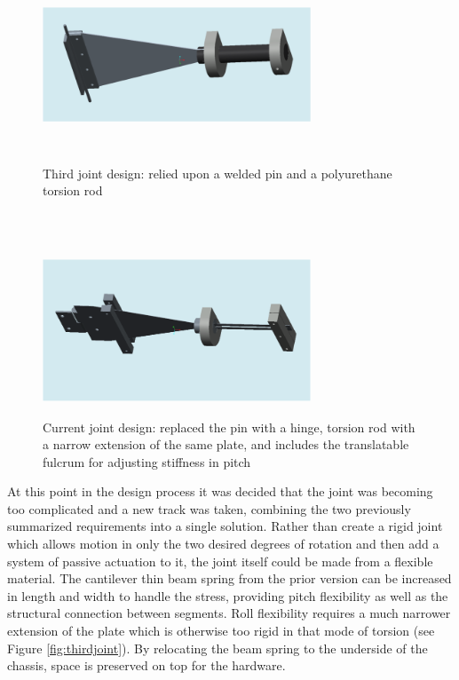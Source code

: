 \documentclass[11pt]{article}
\begin{document}
\begin{figure}[t]
\begin{minipage}[b]{0.45\linewidth}
\centering
\includegraphics[width=8cm,height=5cm]{joint3.png}
\caption{Third joint design: relied upon a welded pin and a polyurethane torsion rod\\\\\\}
\label{fig:thirdjoint}
\end{minipage}
\hspace{0.5cm}
\begin{minipage}[b]{0.45\linewidth}
\centering
\includegraphics[width=8cm,height=5cm]{joint4.png}
\caption{Current joint design: replaced the pin with a hinge, torsion rod with a narrow extension of the same plate, and includes the translatable fulcrum for adjusting stiffness in pitch}
\label{fig:fourthjoint}
\end{minipage}
\end{figure}

At this point in the design process it was decided that the joint was becoming too complicated and a new track was taken, combining the two previously summarized requirements into a single solution. Rather than create a rigid joint which allows motion in only the two desired degrees of rotation and then add a system of passive actuation to it, the joint itself could be made from a flexible material. The cantilever thin beam spring from the prior version can be increased in length and width to handle the stress, providing pitch flexibility as well as the structural connection between segments. Roll flexibility requires a much narrower extension of the plate which is otherwise too rigid in that mode of torsion (see Figure \ref{fig:thirdjoint}). By relocating the beam spring to the underside of the chassis, space is preserved on top for the hardware.
\end{document}

